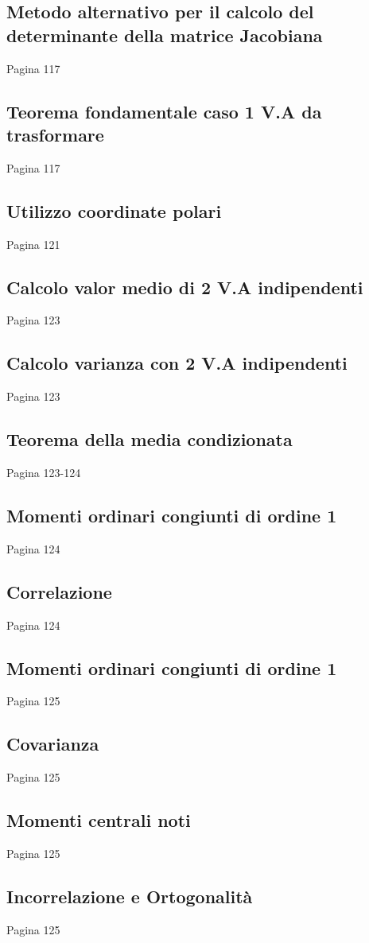 \documentclass{article}
\begin{document}
\subsection{Metodo alternativo per il calcolo del determinante della matrice Jacobiana}
Pagina 117
\subsection{Teorema fondamentale caso 1 V.A da trasformare}
Pagina 117
\subsection{Utilizzo coordinate polari}
Pagina 121
\subsection{Calcolo valor medio di 2 V.A indipendenti}
Pagina 123
\subsection{Calcolo varianza con 2 V.A indipendenti}
Pagina 123
\subsection{Teorema della media condizionata}
Pagina 123-124
\subsection{Momenti ordinari congiunti di ordine 1}
Pagina 124
\subsection{Correlazione}
Pagina 124
\subsection{Momenti ordinari congiunti di ordine 1}
Pagina 125
\subsection{Covarianza}
Pagina 125
\subsection{Momenti centrali noti}
Pagina 125
\subsection{Incorrelazione e Ortogonalità}
Pagina 125
\end{document}
